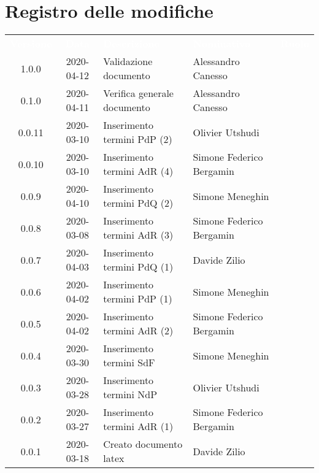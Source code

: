 \section*{Registro delle modifiche}
{
	\centering
	\begin{longtable}{ c c  C{4cm} C{3cm} C{3.5cm} }
		\textcolor{white}{\textbf{Versione}} & \textcolor{white}{\textbf{Data}} & \textcolor{white}{\textbf{Descrizione}} & \textcolor{white}{\textbf{Nominativo}} & \textcolor{white}{\textbf{Ruolo}}\\
		1.0.0 & 2020-04-12 & Validazione documento & Alessandro Canesso &\RdP{}\\
		0.1.0 & 2020-04-11 & Verifica generale documento & Alessandro Canesso &\ver{}\\
		0.0.11 & 2020-03-10 & Inserimento termini PdP (2) & Olivier Utshudi &\ana{}\\
		0.0.10 & 2020-03-10 & Inserimento termini AdR (4) & Simone Federico Bergamin &\ana{}\\
		0.0.9 & 2020-04-10 & Inserimento termini PdQ (2) & Simone Meneghin &\ana{}\\
		0.0.8 & 2020-03-08 & Inserimento termini AdR (3) & Simone Federico Bergamin &\ana{}\\
		0.0.7 & 2020-04-03 & Inserimento termini PdQ (1) & Davide Zilio &\ana{}\\
		0.0.6 & 2020-04-02 & Inserimento termini PdP (1) & Simone Meneghin &\ana{}\\
		0.0.5 & 2020-04-02 & Inserimento termini AdR (2) & Simone Federico Bergamin &\ana{}\\
		0.0.4 & 2020-03-30 & Inserimento termini SdF & Simone Meneghin &\ana{}\\
		0.0.3 & 2020-03-28 & Inserimento termini NdP & Olivier Utshudi &\ana{}\\
		0.0.2 & 2020-03-27 & Inserimento termini AdR (1) & Simone Federico Bergamin &\ana{}\\
		0.0.1 & 2020-03-18 & Creato documento latex & Davide Zilio &\ana{}\\		
		
	\end{longtable}

}